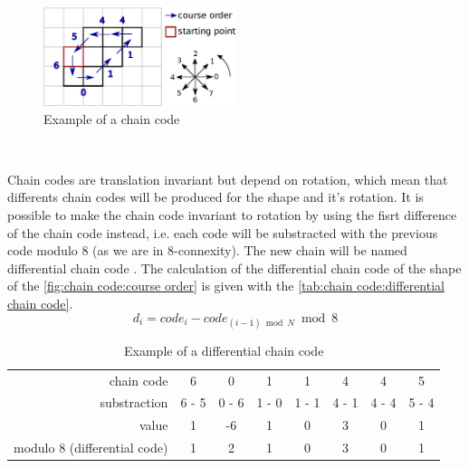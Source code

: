 \begin{figure}[H]
	\centering
	\includegraphics[width=0.5\textwidth]{images/chain_code/example}
	\caption{Example of a chain code}
	\label{fig:chain code:example}	
\end{figure}

~~

Chain codes are translation invariant but depend on rotation, which mean that differents chain codes will be produced for the shape and it's rotation. It is possible to make the chain code invariant to rotation by using the fisrt difference of the chain code instead, i.e. each code will be substracted with the previous code modulo 8 (as we are in 8-connexity). The new chain will be named differential chain code \cite{bib:chain:RepresentationAndDescription}. The calculation of the differential chain code of the shape of the \vref{fig:chain code:course order} is given with the \vref{tab:chain code:differential chain code}.
\begin{equation} \label{eq:chain code:differential chain code}
d_i = code_i - code_{(i-1) \bmod N} \bmod 8
\end{equation}

\begin{table}[h]
	\centering
	\caption{Example of a differential chain code}
	\label{tab:chain code:differential chain code}
	\begin{tabular}{rccccccc}
\toprule 
chain code   & 6     & 0     & 1     & 1     & 4     & 4     & 5     \\
substraction & 6 - 5 & 0 - 6 & 1 - 0 & 1 - 1 & 4 - 1 & 4 - 4 & 5 - 4 \\
value     	 & 1     & -6    & 1     & 0     & 3     & 0     & 1     \\
modulo 8 (differential code)  	 & 1     & 2     & 1     & 0     & 3     & 0     & 1     \\ 
\bottomrule 
	\end{tabular}
\end{table}


